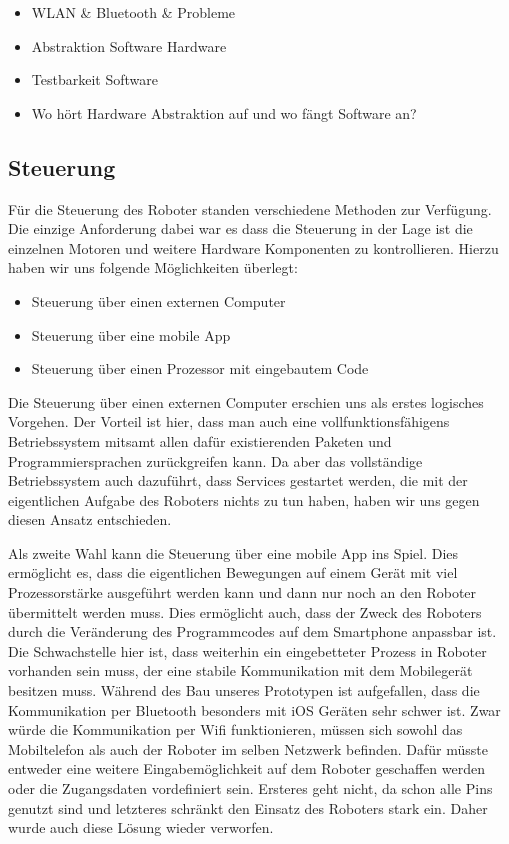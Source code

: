 \documentclass[conference,compsoc,final,a4paper]{IEEEtran}
\begin{document}
\begin{itemize}
  \item WLAN & Bluetooth & Probleme
  \item Abstraktion Software Hardware
  \item Testbarkeit Software
  \item Wo hört Hardware Abstraktion auf und wo fängt Software an?
\end{itemize}

\subsection{Steuerung}

Für die Steuerung des Roboter standen verschiedene Methoden zur Verfügung. Die einzige Anforderung dabei
war es dass die Steuerung in der Lage ist die einzelnen Motoren und weitere Hardware Komponenten
zu kontrollieren. Hierzu haben wir uns folgende Möglichkeiten überlegt:

\begin{itemize}
  \item Steuerung über einen externen Computer
  \item Steuerung über eine mobile App
  \item Steuerung über einen Prozessor mit eingebautem Code
\end{itemize}

Die Steuerung über einen externen Computer erschien uns als erstes logisches Vorgehen. Der Vorteil
ist hier, dass man auch eine vollfunktionsfähigens Betriebssystem mitsamt allen dafür existierenden
Paketen und Programmiersprachen zurückgreifen kann. Da aber das vollständige Betriebssystem auch
dazuführt, dass Services gestartet werden, die mit der eigentlichen Aufgabe des Roboters nichts zu
tun haben, haben wir uns gegen diesen Ansatz entschieden.

Als zweite Wahl kann die Steuerung über eine mobile App ins Spiel. Dies ermöglicht es, dass die
eigentlichen Bewegungen auf einem Gerät mit viel Prozessorstärke ausgeführt werden kann und dann nur
noch an den Roboter übermittelt werden muss. Dies ermöglicht auch, dass der Zweck des Roboters
durch die Veränderung des Programmcodes auf dem Smartphone anpassbar ist. Die Schwachstelle hier ist,
dass weiterhin ein eingebetteter Prozess in Roboter vorhanden sein muss, der eine stabile
Kommunikation mit dem Mobilegerät besitzen muss. Während des Bau unseres Prototypen ist aufgefallen,
dass die Kommunikation per Bluetooth besonders mit iOS Geräten sehr schwer ist. Zwar würde die
Kommunikation per Wifi funktionieren, müssen sich sowohl das Mobiltelefon als auch der Roboter im 
selben Netzwerk befinden. Dafür müsste entweder eine weitere Eingabemöglichkeit auf dem Roboter 
geschaffen werden oder die Zugangsdaten vordefiniert sein. Ersteres geht nicht, da schon alle Pins
genutzt sind und letzteres schränkt den Einsatz des Roboters stark ein. Daher wurde auch diese
Lösung wieder verworfen.
\end{document}
